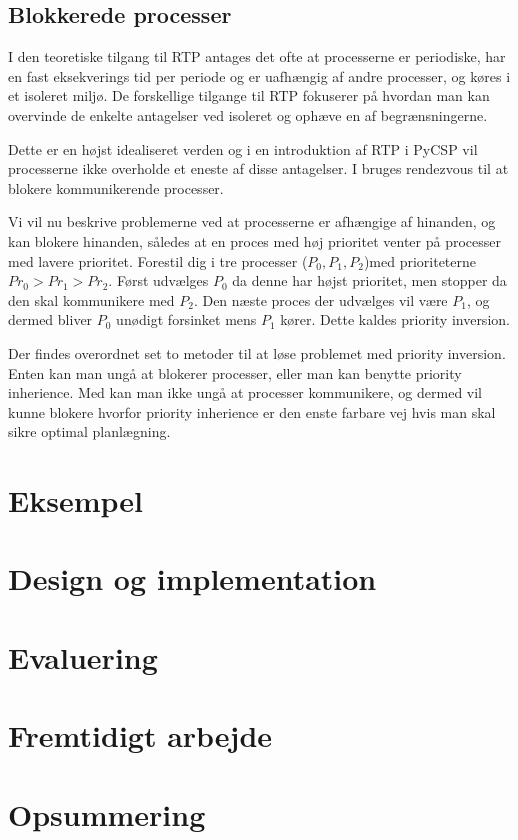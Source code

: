 \begin{shaded}
\subsection{Blokkerede processer}
I den teoretiske tilgang til RTP antages det ofte at processerne er periodiske, har en fast eksekverings tid per periode og er uafhængig af andre processer, og køres i et isoleret miljø. De forskellige tilgange til RTP fokuserer på hvordan man kan overvinde de enkelte antagelser ved isoleret og ophæve en af begrænsningerne. 


Dette er en højst idealiseret verden og i en introduktion af RTP i PyCSP vil processerne ikke overholde et eneste af disse antagelser. 
I \pycsp bruges rendezvous til at blokere kommunikerende processer.

Vi vil nu beskrive problemerne ved at processerne er afhængige af hinanden, og kan blokere hinanden, således at en proces med høj prioritet venter på processer med lavere prioritet. Forestil dig i \pycsp tre processer ($P_0,P_1,P_2$)med prioriteterne $Pr_0>Pr_1>Pr_2$. Først udvælges $P_0$ da denne har højst prioritet, men stopper da den skal kommunikere med $P_2$. Den næste proces der udvælges vil være $P_1$, og dermed bliver $P_0$ unødigt forsinket mens $P_1$ kører. Dette kaldes priority inversion\cite{sha1990priority}.

Der findes overordnet set to metoder til at løse problemet med priority inversion. Enten kan man ungå at blokerer processer, eller man kan benytte priority inherience\cite{sha1990priority}. Med \pycsp kan man ikke ungå at processer kommunikere, og dermed vil kunne blokere hvorfor priority inherience er den enste farbare vej hvis man skal sikre optimal planlægning.
\end{shaded}


  \section{Eksempel}
  \section{Design og implementation}
  \section{Evaluering}
  \section{Fremtidigt arbejde}
  \section{Opsummering}
